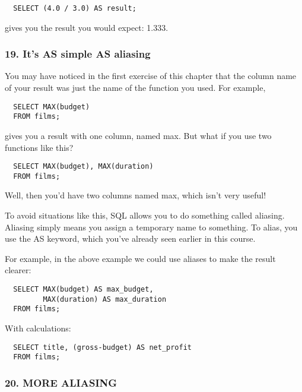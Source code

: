 \documentclass[
]{article}
\begin{document}
\begin{verbatim}
  SELECT (4.0 / 3.0) AS result;
\end{verbatim}

gives you the result you would expect: 1.333.

\hypertarget{its-as-simple-as-aliasing}{%
\subsubsection{19. It's AS simple AS
aliasing}\label{its-as-simple-as-aliasing}}

You may have noticed in the first exercise of this chapter that the
column name of your result was just the name of the function you used.
For example,

\begin{verbatim}
  SELECT MAX(budget)
  FROM films;
\end{verbatim}

gives you a result with one column, named max. But what if you use two
functions like this?

\begin{verbatim}
  SELECT MAX(budget), MAX(duration)
  FROM films;
\end{verbatim}

Well, then you'd have two columns named max, which isn't very useful!

To avoid situations like this, SQL allows you to do something called
aliasing. Aliasing simply means you assign a temporary name to
something. To alias, you use the AS keyword, which you've already seen
earlier in this course.

For example, in the above example we could use aliases to make the
result clearer:

\begin{verbatim}
  SELECT MAX(budget) AS max_budget,
         MAX(duration) AS max_duration
  FROM films;
\end{verbatim}

With calculations:

\begin{verbatim}
  SELECT title, (gross-budget) AS net_profit
  FROM films;
\end{verbatim}

\hypertarget{more-aliasing}{%
\subsubsection{20. MORE ALIASING}\label{more-aliasing}}
\end{document}
